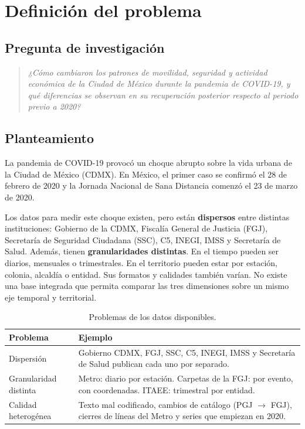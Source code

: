 \section{Definición del problema}\label{sec:problema}

\subsection{Pregunta de investigación}
\begin{quote}
\itshape ¿Cómo cambiaron los patrones de movilidad, seguridad y actividad económica de la
Ciudad de México durante la pandemia de COVID-19, y qué diferencias se observan en su
recuperación posterior respecto al periodo previo a 2020?
\end{quote}

\subsection{Planteamiento}
La pandemia de COVID-19 provocó un choque abrupto sobre la vida urbana de la Ciudad de México (CDMX).
En México, el primer caso se confirmó el 28 de febrero de 2020 y la Jornada Nacional de Sana Distancia
comenzó el 23 de marzo de 2020.

Los datos para medir este choque existen, pero están \textbf{dispersos} entre distintas instituciones:
Gobierno de la CDMX, Fiscalía General de Justicia (FGJ), Secretaría de Seguridad Ciudadana (SSC), C5,
INEGI, IMSS y Secretaría de Salud. Además, tienen \textbf{granularidades distintas}. En el tiempo
pueden ser diarios, mensuales o trimestrales. En el territorio pueden estar por estación, colonia,
alcaldía o entidad. Sus formatos y calidades también varían. No existe una base integrada que permita
comparar las tres dimensiones sobre un mismo eje temporal y territorial.

\begin{table}[h]
\centering
\caption{Problemas de los datos disponibles.}
\small
\begin{tabular}{L{3cm}L{11cm}}
\toprule
\textbf{Problema} & \textbf{Ejemplo}\\
\midrule
Dispersión & Gobierno CDMX, FGJ, SSC, C5, INEGI, IMSS y Secretaría de Salud publican cada uno por separado.\\
Granularidad distinta & Metro: diario por estación. Carpetas de la FGJ: por evento, con coordenadas. ITAEE: trimestral por entidad.\\
Calidad heterogénea & Texto mal codificado, cambios de catálogo (PGJ $\rightarrow$ FGJ), cierres de líneas del Metro y series que empiezan en 2020.\\
\bottomrule
\end{tabular}
\end{table}

